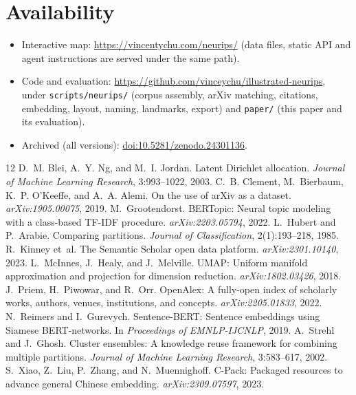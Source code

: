 \documentclass{article}
\begin{document}
\section{Availability}
\begin{itemize}
  \item Interactive map: \url{https://vincentychu.com/neurips/} (data files, static API and agent instructions are served under the same path).
  \item Code and evaluation: \url{https://github.com/vinceychu/illustrated-neurips}, under \texttt{scripts/neurips/} (corpus assembly, arXiv matching, citations, embedding, layout, naming, landmarks, export) and \texttt{paper/} (this paper and its evaluation).
  \item Archived (all versions): \href{https://doi.org/10.5281/zenodo.24301136}{doi:10.5281/zenodo.24301136}.
\end{itemize}

\begin{thebibliography}{12}
 D.~M. Blei, A.~Y. Ng, and M.~I. Jordan. Latent Dirichlet allocation. \emph{Journal of Machine Learning Research}, 3:993--1022, 2003.
 C.~B. Clement, M.~Bierbaum, K.~P. O'Keeffe, and A.~A. Alemi. On the use of arXiv as a dataset. \emph{arXiv:1905.00075}, 2019.
 M.~Grootendorst. BERTopic: Neural topic modeling with a class-based TF-IDF procedure. \emph{arXiv:2203.05794}, 2022.
 L.~Hubert and P.~Arabie. Comparing partitions. \emph{Journal of Classification}, 2(1):193--218, 1985.
 R.~Kinney et~al. The Semantic Scholar open data platform. \emph{arXiv:2301.10140}, 2023.
 L.~McInnes, J.~Healy, and J.~Melville. UMAP: Uniform manifold approximation and projection for dimension reduction. \emph{arXiv:1802.03426}, 2018.
 J.~Priem, H.~Piwowar, and R.~Orr. OpenAlex: A fully-open index of scholarly works, authors, venues, institutions, and concepts. \emph{arXiv:2205.01833}, 2022.
 N.~Reimers and I.~Gurevych. Sentence-BERT: Sentence embeddings using Siamese BERT-networks. In \emph{Proceedings of EMNLP-IJCNLP}, 2019.
 A.~Strehl and J.~Ghosh. Cluster ensembles: A knowledge reuse framework for combining multiple partitions. \emph{Journal of Machine Learning Research}, 3:583--617, 2002.
 S.~Xiao, Z.~Liu, P.~Zhang, and N.~Muennighoff. C-Pack: Packaged resources to advance general Chinese embedding. \emph{arXiv:2309.07597}, 2023.
\end{thebibliography}
\end{document}
